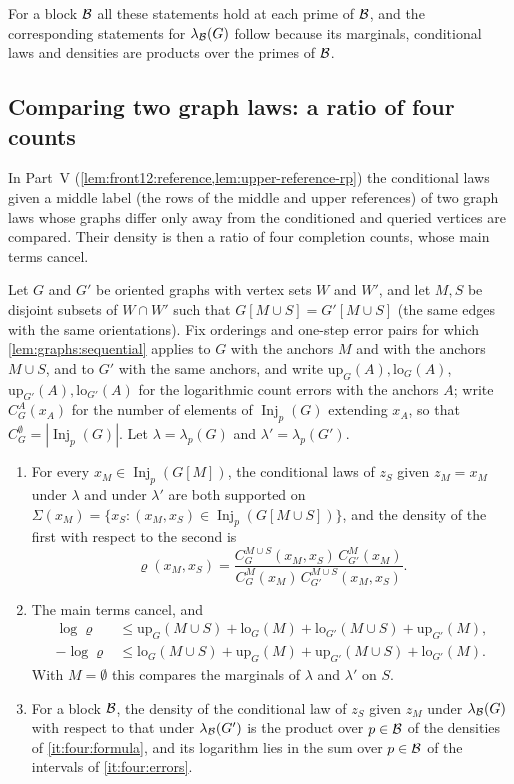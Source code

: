 For a block $\mathcal B$ all these statements hold at each prime of $\mathcal B$, and the
corresponding statements for $\lambda_{\mathcal B}(G)$ follow because its marginals,
conditional laws and densities are products over the primes of $\mathcal B$.

\subsection{Comparing two graph laws: a ratio of four counts}\label{subsec:labellings:four-count}

In Part~V (\cref{lem:front12:reference,lem:upper-reference-rp}) the conditional laws given a middle label (the rows of the middle and upper references) of two graph laws whose graphs differ only away from the conditioned and queried
vertices are compared. Their density is then a ratio of four completion counts, whose main
terms cancel.

\begin{lemma}\label{lem:four-count}
Let $G$ and $G'$ be oriented graphs with vertex sets $W$ and $W'$, and let
$M,S$ be disjoint subsets of $W\cap W'$ such that $G[M\cup S]=G'[M\cup S]$ (the
same edges with the same orientations). Fix orderings and one-step error pairs
for which \cref{lem:graphs:sequential} applies to $G$ with the anchors $M$ and with
the anchors $M\cup S$, and to $G'$ with the same anchors, and write
$\mathrm{up}_G(A),\mathrm{lo}_G(A)$, $\mathrm{up}_{G'}(A),\mathrm{lo}_{G'}(A)$ for
the logarithmic count errors with the anchors $A$; write $C_G^A(x_A)$ for the
number of elements of $\operatorname{Inj}_p(G)$ extending $x_A$, so that
$C_G^\emptyset=|\operatorname{Inj}_p(G)|$. Let $\lambda=\lambda_p(G)$ and $\lambda'=\lambda_p(G')$.
\begin{enumerate}[label=\textup{(\alph*)}]
\item\label{it:four:formula} For every $x_M\in\operatorname{Inj}_p(G[M])$, the conditional laws
 of $z_S$ given $z_M=x_M$ under $\lambda$ and under $\lambda'$ are both supported on
 $\Sigma(x_M)=\{x_S:(x_M,x_S)\in\operatorname{Inj}_p(G[M\cup S])\}$, and the density
 of the first with respect to the second is
 \[
  \varrho(x_M,x_S)=\frac{C_G^{M\cup S}(x_M,x_S)\,C_{G'}^M(x_M)}
  {C_G^M(x_M)\,C_{G'}^{M\cup S}(x_M,x_S)} .
 \]
\item\label{it:four:errors} The main terms cancel, and
 \begin{align*}
  \log\varrho&\le\mathrm{up}_G(M\cup S)+\mathrm{lo}_G(M)+\mathrm{lo}_{G'}(M\cup S)
  +\mathrm{up}_{G'}(M),\\
  -\log\varrho&\le\mathrm{lo}_G(M\cup S)+\mathrm{up}_G(M)+\mathrm{up}_{G'}(M\cup S)
  +\mathrm{lo}_{G'}(M).
 \end{align*}
 With $M=\emptyset$ this compares the marginals of $\lambda$ and $\lambda'$ on $S$.
\item\label{it:four:block} For a block $\mathcal B$, the density of the conditional law of
 $z_S$ given $z_M$ under $\lambda_{\mathcal B}(G)$ with respect to that under
 $\lambda_{\mathcal B}(G')$ is the product over $p\in\mathcal B$ of the densities of
 \ref{it:four:formula}, and its logarithm lies in the sum over $p\in\mathcal B$ of the
 intervals of \ref{it:four:errors}.
\end{enumerate}
\end{lemma}

